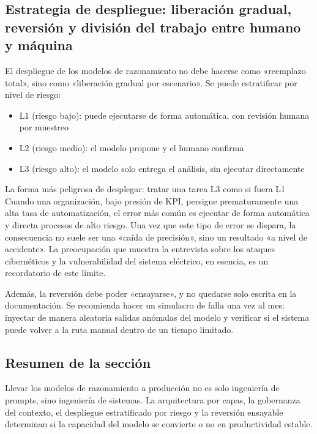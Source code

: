 \documentclass[a4paper]{article}
\begin{document}
\subsection{Estrategia de despliegue: liberación gradual, reversión y división del trabajo entre humano y máquina}

El despliegue de los modelos de razonamiento no debe hacerse como «reemplazo total», sino como «liberación gradual por escenario». Se puede estratificar por nivel de riesgo:
\begin{itemize}
    \item L1 (riesgo bajo): puede ejecutarse de forma automática, con revisión humana por muestreo
    \item L2 (riesgo medio): el modelo propone y el humano confirma
    \item L3 (riesgo alto): el modelo solo entrega el análisis, sin ejecutar directamente
\end{itemize}

\begin{warningbox}{La forma más peligrosa de desplegar: tratar una tarea L3 como si fuera L1}
Cuando una organización, bajo presión de KPI, persigue prematuramente una alta tasa de automatización, el error más común es ejecutar de forma automática y directa procesos de alto riesgo. Una vez que este tipo de error se dispara, la consecuencia no suele ser una «caída de precisión», sino un resultado «a nivel de accidente». La preocupación que muestra la entrevista sobre los ataques cibernéticos y la vulnerabilidad del sistema eléctrico, en esencia, es un recordatorio de este límite.
\end{warningbox}

Además, la reversión debe poder «ensayarse», y no quedarse solo escrita en la documentación. Se recomienda hacer un simulacro de falla una vez al mes: inyectar de manera aleatoria salidas anómalas del modelo y verificar si el sistema puede volver a la ruta manual dentro de un tiempo limitado.

\subsection{Resumen de la sección}

Llevar los modelos de razonamiento a producción no es solo ingeniería de prompts, sino ingeniería de sistemas. La arquitectura por capas, la gobernanza del contexto, el despliegue estratificado por riesgo y la reversión ensayable determinan si la capacidad del modelo se convierte o no en productividad estable.
\end{document}

